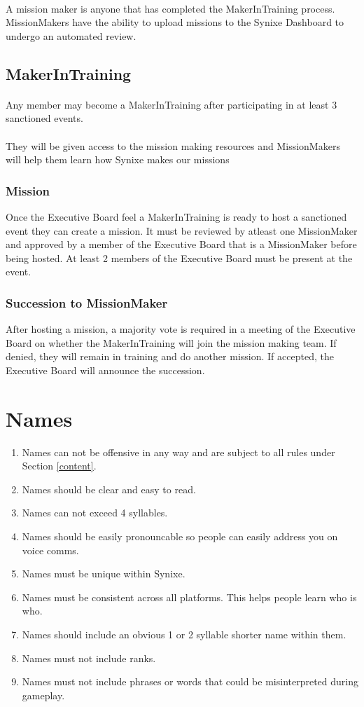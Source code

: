 \documentclass[10pt,a4paper]{article}
\begin{document}
\paragraph{}
A mission maker is anyone that has completed the MakerInTraining process. MissionMakers have the ability to upload missions to the Synixe Dashboard to undergo an automated review.
\subsection{MakerInTraining}
\paragraph{}
Any member may become a MakerInTraining after participating in at least 3 sanctioned events.
\paragraph{}
They will be given access to the mission making resources and MissionMakers will help them learn how Synixe makes our missions
\subsubsection{Mission}
Once the Executive Board feel a MakerInTraining is ready to host a sanctioned event they can create a mission. It must be reviewed by atleast one MissionMaker and approved by a member of the Executive Board that is a MissionMaker before being hosted. At least 2 members of the Executive Board must be present at the event.
\subsubsection{Succession to MissionMaker}
After hosting a mission, a majority vote is required in a meeting of the Executive Board on whether the MakerInTraining will join the mission making team. If denied, they will remain in training and do another mission. If accepted, the Executive Board will announce the succession.
\section{Names} \label{names}
\begin{enumerate}
	\item Names can not be offensive in any way and are subject to all rules under Section \ref{content}.
	\item Names should be clear and easy to read.
	\item Names can not exceed 4 syllables.
	\item Names should be easily pronouncable so people can easily address you on voice comms.
	\item Names must be unique within Synixe.
	\item Names must be consistent across all platforms. This helps people learn who is who.
	\item Names should include an obvious 1 or 2 syllable shorter name within them.
	\item Names must not include ranks.
	\item Names must not include phrases or words that could be misinterpreted during gameplay.
\end{enumerate}
\end{document}
